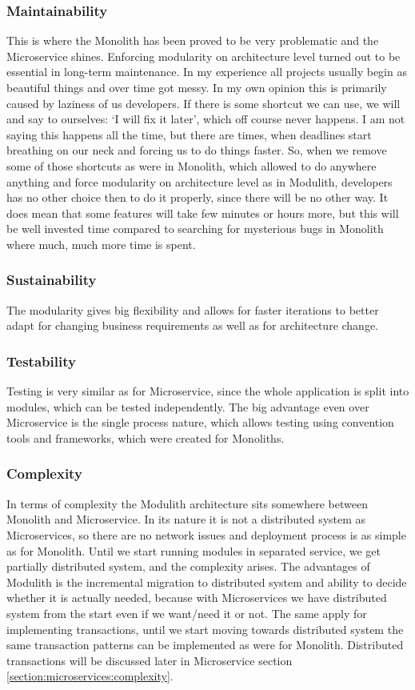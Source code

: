 \subsubsection{Maintainability}
This is where the Monolith has been proved to be very problematic and the Microservice shines. Enforcing modularity on architecture level turned out to be essential in long-term maintenance. In my experience all projects usually begin as beautiful things and over time got messy. In my own opinion this is primarily caused by laziness of us developers. If there is some shortcut we can use, we will and say to ourselves: `I will fix it later', which off course never happens. I am not saying this happens all the time, but there are times, when deadlines start breathing on our neck and forcing us to do things faster. So, when we remove some of those shortcuts as were in Monolith, which allowed to do anywhere anything and force modularity on architecture level as in Modulith, developers has no other choice then to do it properly, since there will be no other way. It does mean that some features will take few minutes or hours more, but this will be well invested time compared to searching for mysterious bugs in Monolith where much, much more time is spent.

\subsubsection{Sustainability}
The modularity gives big flexibility and allows for faster iterations to better adapt for changing business requirements as well as for architecture change.

\subsubsection{Testability}
Testing is very similar as for Microservice, since the whole application is split into modules, which can be tested independently. The big advantage even over Microservice is the single process nature, which allows testing using convention tools and frameworks, which were created for Monoliths.

\subsubsection{Complexity}
In terms of complexity the Modulith architecture sits somewhere between Monolith and Microservice. In its nature it is not a distributed system as Microservices, so there are no network issues and deployment process is as simple as for Monolith. Until we start running modules in separated service, we get partially distributed system, and the complexity arises. The advantages of Modulith is the incremental migration to distributed system and ability to decide whether it is actually needed, because with Microservices we have distributed system from the start even if we want/need it or not. The same apply for implementing transactions, until we start moving towards distributed system the same transaction patterns can be implemented as were for Monolith. Distributed transactions will be discussed later in Microservice section \ref{section:microservices:complexity}.